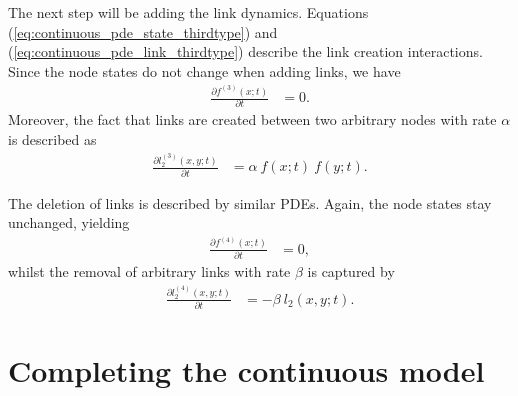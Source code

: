 The next step will be adding the link dynamics. Equations (\ref{eq:continuous_pde_state_thirdtype}) and (\ref{eq:continuous_pde_link_thirdtype}) describe the link creation interactions. Since the node states do not change when adding links, we have
\begin{equation}
\begin{aligned}
    \frac{\partial f^{(3)}(x;t)}{\partial t} 
    &= 0
    .
    \label{eq:continuous_pde_state_thirdtype}
\end{aligned}
\end{equation}
Moreover, the fact that links are created between two arbitrary nodes with rate $\alpha$ is described as 
\begin{equation}
\begin{aligned}
    \frac{\partial l^{(3)}_2(x,y;t)}{\partial t} 
    &= \alpha \ f(x;t)\ f(y;t)
    .
    \label{eq:continuous_pde_link_thirdtype}
\end{aligned}
\end{equation}

The deletion of links is described by similar PDEs. Again, the node states stay unchanged, yielding
\begin{equation}
\begin{aligned}
    \frac{\partial f^{(4)}(x;t)}{\partial t} 
    &= 0,
    \label{eq:continuous_pde_state_fourthtype}
\end{aligned}
\end{equation}
whilst the removal of arbitrary links with rate $\beta $ is captured by 
\begin{equation}
\begin{aligned}
    \frac{\partial l^{(4)}_2(x,y;t)}{\partial t} 
    &= -\beta\ l_2(x,y;t)
    .
    \label{eq:continuous_pde_link_fourthtype}
\end{aligned}
\end{equation}







\section{Completing the continuous model}

